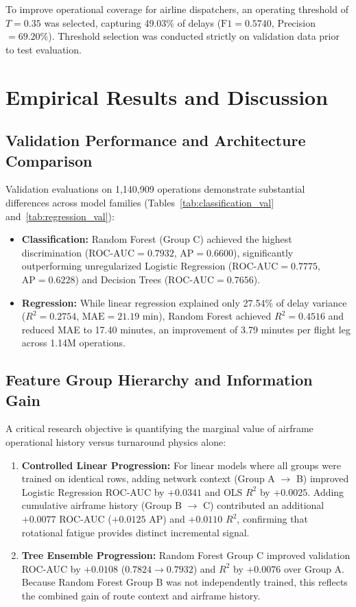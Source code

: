 \documentclass[conference]{IEEEtran}
\begin{document}
To improve operational coverage for airline dispatchers, an operating threshold of $T = 0.35$ was selected, capturing 49.03\% of delays ($\text{F1} = 0.5740$, Precision $= 69.20\%$). Threshold selection was conducted strictly on validation data prior to test evaluation.

\section{Empirical Results and Discussion}

\subsection{Validation Performance and Architecture Comparison}
Validation evaluations on 1,140,909 operations demonstrate substantial differences across model families (Tables~\ref{tab:classification_val} and~\ref{tab:regression_val}):
\begin{itemize}
    \item \textbf{Classification:} Random Forest (Group C) achieved the highest discrimination ($\text{ROC-AUC} = 0.7932$, $\text{AP} = 0.6600$), significantly outperforming unregularized Logistic Regression ($\text{ROC-AUC} = 0.7775$, $\text{AP} = 0.6228$) and Decision Trees ($\text{ROC-AUC} = 0.7656$).
    \item \textbf{Regression:} While linear regression explained only 27.54\% of delay variance ($R^2 = 0.2754$, $\text{MAE} = 21.19$ min), Random Forest achieved $R^2 = 0.4516$ and reduced MAE to 17.40 minutes, an improvement of 3.79 minutes per flight leg across 1.14M operations.
\end{itemize}

\subsection{Feature Group Hierarchy and Information Gain}
A critical research objective is quantifying the marginal value of airframe operational history versus turnaround physics alone:
\begin{enumerate}
    \item \textbf{Controlled Linear Progression:} For linear models where all groups were trained on identical rows, adding network context (Group A $\rightarrow$ B) improved Logistic Regression ROC-AUC by $+0.0341$ and OLS $R^2$ by $+0.0025$. Adding cumulative airframe history (Group B $\rightarrow$ C) contributed an additional $+0.0077$ ROC-AUC ($+0.0125$ AP) and $+0.0110$ $R^2$, confirming that rotational fatigue provides distinct incremental signal.
    \item \textbf{Tree Ensemble Progression:} Random Forest Group C improved validation ROC-AUC by $+0.0108$ ($0.7824 \rightarrow 0.7932$) and $R^2$ by $+0.0076$ over Group A. Because Random Forest Group B was not independently trained, this reflects the combined gain of route context and airframe history.
\end{enumerate}
\end{document}
